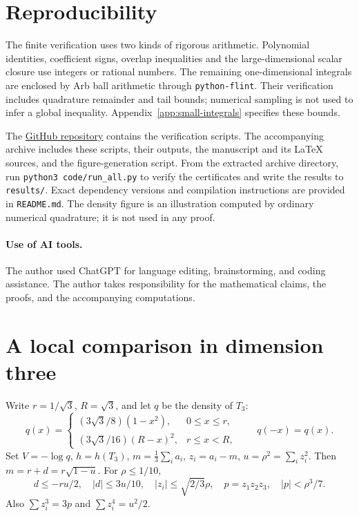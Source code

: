 \documentclass[11pt,a4paper]{article}
\theoremstyle{remark}\newtheorem{remark}[theorem]{Remark}
\begin{document}
\section{Reproducibility}\label{sec:reproduce}
The finite verification uses two kinds of rigorous arithmetic. Polynomial
identities, coefficient signs, overlap inequalities and the
large-dimensional scalar closure use integers or rational numbers.
The remaining one-dimensional integrals are enclosed by Arb ball arithmetic \cite{Johansson2017arb} through \texttt{python-flint}. Their verification includes
quadrature remainder and tail bounds; numerical sampling is not used to
infer a global inequality. Appendix~\ref{app:small-integrals} specifies these
bounds.

The \href{https://github.com/vukhacky/ent-conjecture/}{GitHub repository}
contains the verification scripts. The accompanying archive includes
these scripts, their outputs, the manuscript and its LaTeX sources,
and the figure-generation script. From the extracted archive directory,
run \texttt{python3 code/run\_all.py} to verify the certificates and write
the results to \texttt{results/}. Exact dependency versions and compilation
instructions are provided in \texttt{README.md}.
The density figure is an illustration computed by ordinary numerical
quadrature; it is not used in any proof.

\paragraph{Use of AI tools.}
The author used ChatGPT for language editing, brainstorming, and coding
assistance. The author takes responsibility for the mathematical claims,
the proofs, and the accompanying computations.

\appendix
\section{A local comparison in dimension three}\label{app:small-three}

Write $r=1/\sqrt3$, $R=\sqrt3$, and let $q$ be the density of $T_3$:
\[
q(x)=\begin{cases}
(3\sqrt3/8)(1-x^2),&0\le x\le r,\\
(3\sqrt3/16)(R-x)^2,&r\le x<R,
\end{cases}
\qquad q(-x)=q(x).
\]
Set $V=-\log q$, $h=h(T_3)$,
$m=\frac13\sum_i a_i$, $z_i=a_i-m$, $u=\rho^2=\sum_i z_i^2$.
Then $m=r+d=r\sqrt{1-u}$. For $\rho\le1/10$,
\[
d\le-ru/2,\quad |d|\le3u/10,\quad |z_i|\le\sqrt{2/3}\rho,
\quad p=z_1z_2z_3,\quad |p|<\rho^3/7.
\]
Also $\sum z_i^3=3p$ and $\sum z_i^4=u^2/2$.
\end{document}

